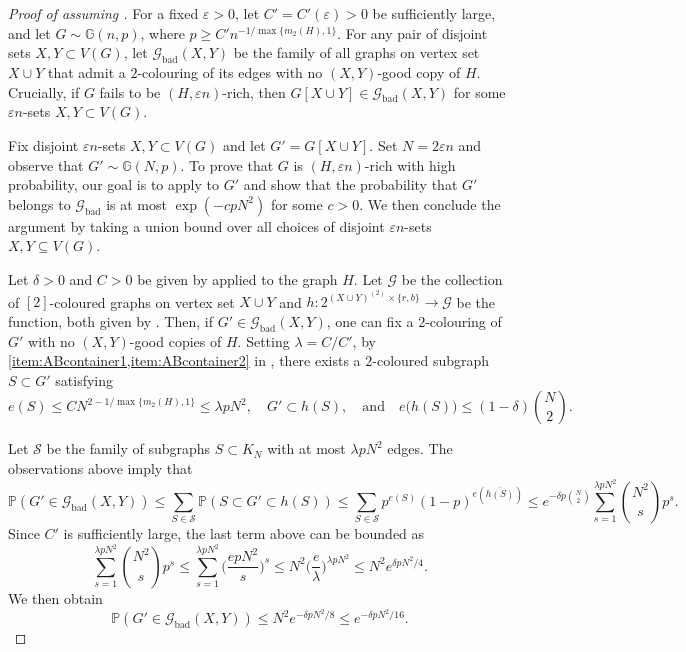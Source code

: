 \documentclass[a4paper,reqno,11pt]{amsart}
\theoremstyle{definition}
\theoremstyle{remark}
\newcommand\cG{\mathcal{G}}
\newcommand\cS{\mathcal{S}}
\renewcommand\leq{\leqslant}
\renewcommand\le{\leqslant}
\renewcommand\ge{\geqslant}
\renewcommand\to{\rightarrow}
\def\Prob{\mathbb{P}}
\begin{document}
\begin{proof}[Proof of  assuming ] 

For a fixed $\varepsilon > 0$, let $C'=C'(\varepsilon) > 0$ be sufficiently large, and let $G \sim \mathbb{G}(n,p)$, where $p \ge C' n^{-1/\max\{m_2(H),1\}}$. 
For any pair of disjoint sets $X, Y \subset V(G)$, let $\cG_{\text{bad}}(X,Y)$ be the family of all graphs on vertex set $X\cup Y$ that admit a $2$-colouring of its edges with no $(X,Y)$-good copy of $H$.  Crucially, if $G$ fails to be $(H, \varepsilon n)$-rich, then $G[X \cup Y] \in \mathcal{G}_{\text{bad}}(X,Y)$ for some $\varepsilon n$-sets $X,Y \subset V(G)$.

Fix disjoint $\varepsilon n$-sets $X, Y \subset V(G)$ and let $G' = G[X \cup Y]$. Set $N = 2\varepsilon n$ and observe that $G' \sim \mathbb{G}(N,p)$. To prove that $G$ is $(H, \varepsilon n)$-rich with high probability, our goal is to apply  to $G'$ and show that the probability that $G'$ belongs to $\cG_{\text{bad}}$ is at most $\exp(-cpN^2)$ for some $c>0$. We then conclude the argument by taking a union bound over all choices of disjoint $\varepsilon n$-sets $X,Y \subseteq V(G)$.

Let $\delta>0$ and $C>0$ be given by  applied to the graph $H$. Let $\cG$ be the collection of $[2]$-coloured graphs on vertex set $X \cup Y$ and $h\colon 2^{(X \cup Y)^{(2)} \times \{r,b\}} \to \cG$ be the function, both given by . Then, if $G'\in \cG_{\text{bad}}(X,Y)$, one can fix a $2$-colouring of $G'$ with no $(X,Y)$-good copies of $H$. Setting $\lambda=C/C'$, by \cref{item:ABcontainer1,item:ABcontainer2} in , there exists a $2$-coloured subgraph $S \subset G'$ satisfying
\begin{equation*}
e(S) \le CN^{2-1/\max\{m_2(H),1\}}\le \lambda pN^2,\quad G' \subset h(S),\quad\text{and}\quad e\big(h(S)\big)\leq(1-\delta)\binom{N}{2}.
\end{equation*}

Let $\cS$ be the family of subgraphs $S \subset K_N$ with at most $\lambda pN^2$ edges. The observations above imply that
\begin{equation*}
\Prob(G' \in \cG_{\text{bad}}(X,Y)) \le \sum_{S \in \cS}\Prob(S \subset G' \subset h(S)) 
\leq \sum_{S\in\cS}p^{e(S)}(1-p)^{e(\overline{h(S)})}\leq e^{-\delta p\binom{N}{2}}\sum_{s=1}^{\lambda pN^2}\binom{N^2}{s}p^s.
\end{equation*}
Since $C'$ is sufficiently large, the last term above can be bounded as
\[
\sum_{s=1}^{\lambda pN^2}\binom{N^2}{s}p^s\leq\sum_{s=1}^{\lambda pN^2} \bigg(\frac{epN^2}{s}\bigg)^{s}\leq N^2\bigg(\frac{e}{\lambda}\bigg)^{\lambda pN^2}\le N^2 e^{\delta pN^2/4}. 
\]
We then obtain
\[
\Prob(G' \in \cG_{\text{bad}}(X,Y)) \leq N^2e^{-\delta pN^2/8} \leq e^{-\delta pN^2/16}.
\]


\end{proof}
\end{document}
